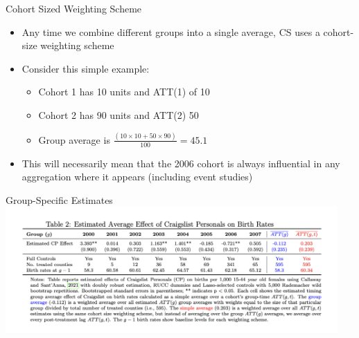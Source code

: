 \documentclass{beamer}
\begin{document}
\begin{frame}{Cohort Sized Weighting Scheme}

\begin{itemize}
\item Any time we combine different groups into a single average, CS uses a cohort-size weighting scheme 
\item Consider this simple example:
    \begin{itemize}
    \item Cohort 1 has 10 units and ATT(1) of 10
    \item Cohort 2 has 90 units and ATT(2) 50
    \item Group average is $\frac{(10 \times 10 + 50 \times 90)}{100}=45.1$
    \end{itemize}
\item This will necessarily mean that the 2006 cohort is always influential in any aggregation where it appears (including event studies)
\end{itemize}

\end{frame}

\begin{frame}{Group-Specific Estimates}
\centering
\includegraphics[width=0.95\textwidth]{./lecture_includes/group_averages.png}
\end{frame}
\end{document}
